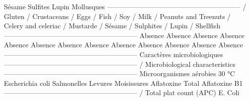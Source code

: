 \newline Sésame \newline Sulfites \newline Lupin \newline Mollusques \newline ----------------------------------------------------------- \newline / Gluten \newline / Crustaceans \newline / Eggs \newline / Fish \newline / Soy \newline / Milk \newline / Peanuts and Treenuts \newline / Celery and celeriac \newline / Mustarde \newline / Sésame \newline / Sulphites \newline / Lupin \newline / Shellfish \newline ----------------------------------------------------------- \newline Absence \newline Absence \newline Absence \newline Absence \newline Absence \newline Absence \newline Absence \newline Absence \newline Absence \newline Absence \newline Absence \newline Absence \newline Absence \newline ----------------------------------------------------------- \newline Caractères microbiologiques \newline ----------------------------------------------------------- \newline / Microbiological characteristics \newline ----------------------------------------------------------- \newline Microorganismes aérobies 30 °C \newline Escherichia coli  \newline Salmonelles \newline Levures \newline Moisissures \newline Aflatoxine Total \newline Aflatoxine B1 \newline ----------------------------------------------------------- \newline / Total plat count (APC) \newline E. Coli \newline 